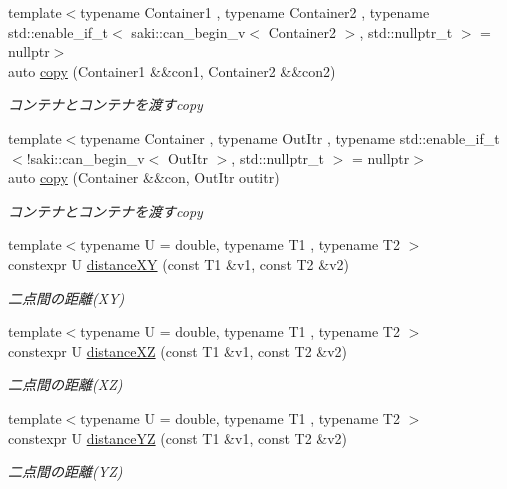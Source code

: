 \begin{DoxyCompactItemize}
{\footnotesize template$<$typename Container1 , typename Container2 , typename std\+::enable\+\_\+if\+\_\+t$<$ saki\+::can\+\_\+begin\+\_\+v$<$ Container2 $>$, std\+::nullptr\+\_\+t $>$  = nullptr$>$ }\\auto \mbox{\hyperlink{namespacesaki_a469bffdeaee5edab8000f7174b9de5f2}{copy}} (Container1 \&\&con1, Container2 \&\&con2)
\begin{DoxyCompactList}\small\item\em コンテナとコンテナを渡すcopy \end{DoxyCompactList}\item 
{\footnotesize template$<$typename Container , typename Out\+Itr , typename std\+::enable\+\_\+if\+\_\+t$<$!saki\+::can\+\_\+begin\+\_\+v$<$ Out\+Itr $>$, std\+::nullptr\+\_\+t $>$  = nullptr$>$ }\\auto \mbox{\hyperlink{namespacesaki_a810f851279b6d10acc3892433f7036fd}{copy}} (Container \&\&con, Out\+Itr outitr)
\begin{DoxyCompactList}\small\item\em コンテナとコンテナを渡すcopy \end{DoxyCompactList}\item 
{\footnotesize template$<$typename U  = double, typename T1 , typename T2 $>$ }\\constexpr U \mbox{\hyperlink{namespacesaki_ac7860b024b9f60e5d2426448504cdfa5}{distance\+XY}} (const T1 \&v1, const T2 \&v2)
\begin{DoxyCompactList}\small\item\em 二点間の距離(\+X\+Y) \end{DoxyCompactList}\item 
{\footnotesize template$<$typename U  = double, typename T1 , typename T2 $>$ }\\constexpr U \mbox{\hyperlink{namespacesaki_aa160b674649d86e048ff2676e20b0d25}{distance\+XZ}} (const T1 \&v1, const T2 \&v2)
\begin{DoxyCompactList}\small\item\em 二点間の距離(\+X\+Z) \end{DoxyCompactList}\item 
{\footnotesize template$<$typename U  = double, typename T1 , typename T2 $>$ }\\constexpr U \mbox{\hyperlink{namespacesaki_a430390838f23403a3efc4182aed002b1}{distance\+YZ}} (const T1 \&v1, const T2 \&v2)
\begin{DoxyCompactList}\small\item\em 二点間の距離(\+Y\+Z) \end{DoxyCompactList}\item 

\end{DoxyCompactItemize}
